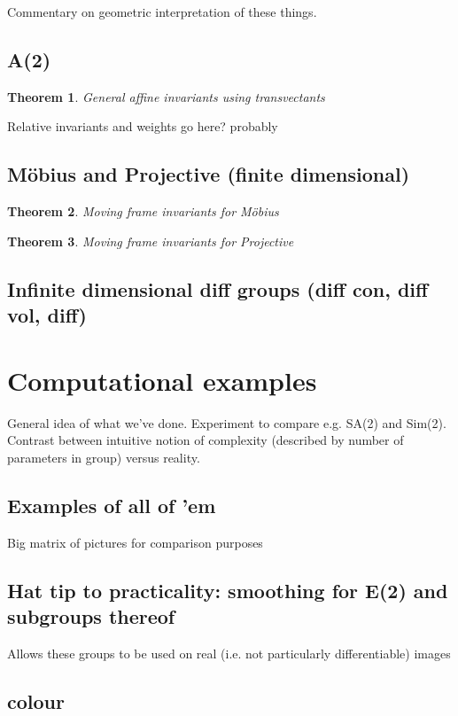 \documentclass{article}
\newtheorem{theorem}{Theorem}
\begin{document}
Commentary on geometric interpretation of these things.
\subsection{A(2)}
\begin{theorem}
  General affine invariants using transvectants
\end{theorem}
Relative invariants and weights go here? probably

\subsection{M\"obius and Projective (finite dimensional)}
\begin{theorem}
  Moving frame invariants for M\"obius
\end{theorem}
\begin{theorem}
  Moving frame invariants for Projective
\end{theorem}

\subsection{Infinite dimensional diff groups (diff con, diff vol, diff)}




\section{Computational examples}
General idea of what we've done. Experiment to compare e.g. SA(2) and
Sim(2). Contrast between intuitive notion of complexity (described by
number of parameters in group) versus reality.

\subsection{Examples of all of 'em}
Big matrix of pictures for comparison purposes

\subsection{Hat tip to practicality: smoothing for E(2) and subgroups thereof}
Allows these groups to be used on real (i.e. not particularly
differentiable) images

\subsection{colour}
\end{document}
